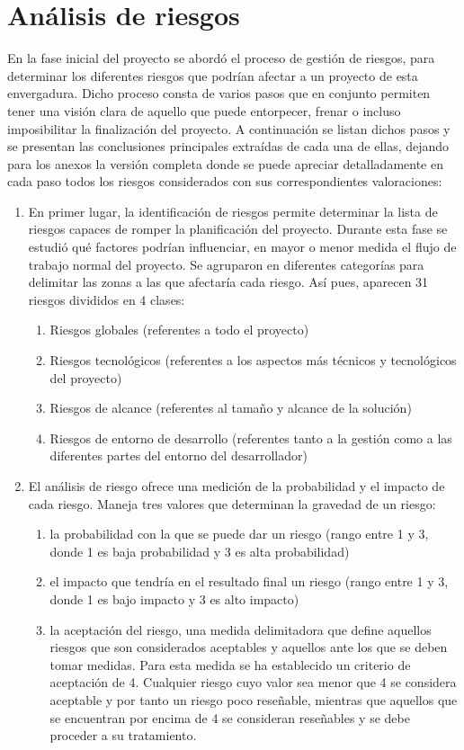 \section{Análisis de riesgos}
En la fase inicial del proyecto se abordó el proceso de gestión de riesgos, para determinar los diferentes riesgos que podrían afectar a un proyecto de esta envergadura. Dicho proceso consta de varios pasos que en conjunto permiten tener una visión clara de aquello que puede entorpecer, frenar o incluso imposibilitar la finalización del proyecto. A continuación se listan dichos pasos y se presentan las conclusiones principales extraídas de cada una de ellas, dejando para los anexos la versión completa donde se puede apreciar detalladamente en cada paso todos los riesgos considerados con sus correspondientes valoraciones: 
\begin{enumerate}
\item En primer lugar, la identificación de riesgos permite determinar la lista de riesgos capaces de romper la planificación del proyecto. Durante esta fase se estudió qué factores podrían influenciar, en mayor o menor medida el flujo de trabajo normal del proyecto. Se agruparon en diferentes categorías para delimitar las zonas a las que afectaría cada riesgo. Así pues, aparecen 31 riesgos divididos en 4 clases:
\begin{enumerate}
\item Riesgos globales (referentes a todo el proyecto)
\item Riesgos tecnológicos (referentes a los aspectos más técnicos y tecnológicos del proyecto)
\item Riesgos de alcance (referentes al tamaño y alcance de la solución)
\item Riesgos de entorno de desarrollo (referentes tanto a la gestión como a las diferentes partes del entorno del desarrollador)
\end{enumerate}
\item El análisis de riesgo ofrece una medición de la probabilidad y el impacto de cada riesgo. Maneja tres valores que determinan la gravedad de un riesgo: 
\begin{enumerate}
\item la probabilidad con la que se puede dar un riesgo (rango entre 1 y 3, donde 1 es baja probabilidad y 3 es alta probabilidad)
\item el impacto que tendría en el resultado final un riesgo (rango entre 1 y 3, donde 1 es bajo impacto y 3 es alto impacto)
\item la aceptación del riesgo, una medida delimitadora que define aquellos riesgos que son considerados aceptables y aquellos ante los que se deben tomar medidas. Para esta medida se ha establecido un criterio de aceptación de 4. Cualquier riesgo cuyo valor sea menor que 4 se considera aceptable y por tanto un riesgo poco reseñable, mientras que aquellos que se encuentran por encima de 4 se consideran reseñables y se debe proceder a su tratamiento. 

\end{enumerate}
\end{enumerate}
